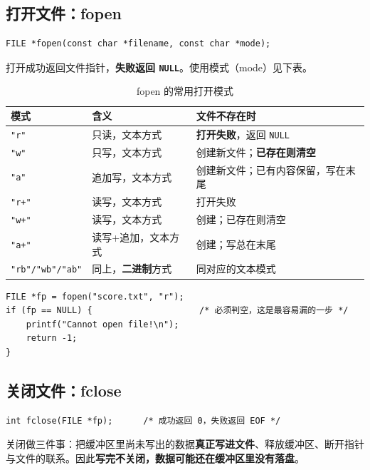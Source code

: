 \subsection{打开文件：fopen}
\begin{lstlisting}
FILE *fopen(const char *filename, const char *mode);
\end{lstlisting}
打开成功返回文件指针，\textbf{失败返回 \texttt{NULL}}。使用模式（mode）见下表。

\begin{table}[htbp]
\centering
\caption{fopen 的常用打开模式}
\footnotesize
\begin{tabularx}{\textwidth}{@{}p{2.8cm}p{5.4cm}X@{}}
\toprule
模式 & 含义 & 文件不存在时 \\
\midrule
\texttt{"r"} & 只读，文本方式 & \textbf{打开失败}，返回 \texttt{NULL} \\
\texttt{"w"} & 只写，文本方式 & 创建新文件；\textbf{已存在则清空} \\
\texttt{"a"} & 追加写，文本方式 & 创建新文件；已有内容保留，写在末尾 \\
\texttt{"r+"} & 读写，文本方式 & 打开失败 \\
\texttt{"w+"} & 读写，文本方式 & 创建；已存在则清空 \\
\texttt{"a+"} & 读写+追加，文本方式 & 创建；写总在末尾 \\
\texttt{"rb"/"wb"/"ab"} & 同上，\textbf{二进制}方式 & 同对应的文本模式 \\
\bottomrule
\end{tabularx}
\end{table}

\begin{lstlisting}
FILE *fp = fopen("score.txt", "r");
if (fp == NULL) {                     /* 必须判空，这是最容易漏的一步 */
    printf("Cannot open file!\n");
    return -1;
}
\end{lstlisting}

\subsection{关闭文件：fclose}
\begin{lstlisting}
int fclose(FILE *fp);      /* 成功返回 0，失败返回 EOF */
\end{lstlisting}
关闭做三件事：把缓冲区里尚未写出的数据\textbf{真正写进文件}、释放缓冲区、断开指针与文件的联系。因此\textbf{写完不关闭，数据可能还在缓冲区里没有落盘}。


